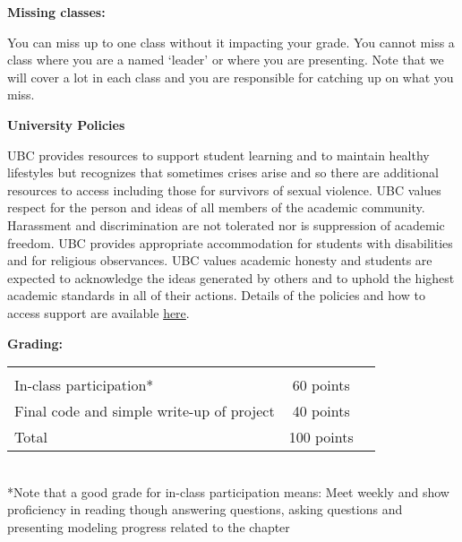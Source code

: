 \documentclass[11pt]{article}
\begin{document}
\begin{large} 
{\raggedright \textbf{Missing classes:}}
\end{large}
You can miss up to one class without it impacting your grade. You cannot miss a class where you are a named `leader' or where you are presenting. Note that we will cover a lot in each class and you are responsible for catching up on what you miss.\\

\begin{large} 
{\raggedright \textbf{University Policies}}
\end{large}
UBC provides resources to support student learning and to maintain healthy lifestyles but recognizes that sometimes crises arise and so there are additional resources to access including those for survivors of sexual violence. UBC values respect for the person and ideas of all members of the academic community. Harassment and discrimination are not tolerated nor is suppression of academic freedom. UBC provides appropriate accommodation for students with disabilities and for religious observances. UBC values academic honesty and students are expected to acknowledge the ideas generated by others and to uphold the highest academic standards in all of their actions. Details of the policies and how to access support are available \href {https://senate.ubc.ca/policies-resources-guide-students-success}{here}.\\

\begin{large} 
{\raggedright \textbf{Grading:}}
\end{large}

\begin{tabular}{lcr}
& & \\ [-12pt]
In-class participation* & \hspace{14pt} 60 points\\ %
Final code and simple write-up of project & \hspace{14pt} 40 points\\ 
Total & \hspace{14pt} 100 points
\end{tabular}
\vspace{2ex}\\
*Note that a good grade for in-class participation means: Meet weekly and show proficiency in reading though answering questions, asking questions and presenting modeling progress related to the chapter 
\end{document}
